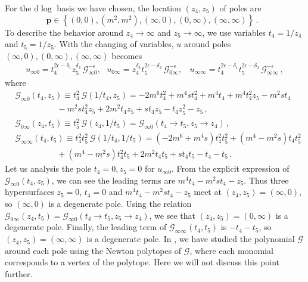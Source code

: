 \documentclass[a4paper,11pt]{article}
\newcommand{\nn}{\nonumber}
\newcommand{\nd}{\mathrm{d}}
\newcommand{\mG}{\mathcal{G}}
\newcommand{\ep}{\epsilon}
\newcommand{\bea}{\begin{eqnarray}}
\newcommand{\eea}{\end{eqnarray}}
\begin{document}
For the $\nd \log$ basis we have chosen, the location  $(z_4,z_5)$ of poles are 
\begin{equation}
    \bm{p} \in \left\{ (0,0), (m^2,m^2), (\infty,0), (0,\infty), (\infty,\infty) \right\} \, . ~~~\label{5.8}
\end{equation}
To describe the behavior around $z_4\to \infty$ and $z_5\to \infty$, we use variables $t_4=1/z_4$ and  $t_5=1/z_5$.
With the changing of variables, $u$ around poles $(\infty,0), (0,\infty), (\infty,\infty)$ becomes
\bea
u_{\infty 0}=t_4^{2\epsilon-\delta_1} z_5^{\delta_2} \, \mG_{\infty 0}^{-\epsilon},~~~
u_{0 \infty}= z_4^{\delta_2}t_5^{2\epsilon-\delta_2} \, \mG_{ 0\infty}^{-\epsilon},~~~~
u_{\infty \infty}=t_4^{2\epsilon-\delta_1} t_5^{2\ep-\delta_2} \, \mG_{\infty \infty}^{-\epsilon} \, ,  \eea
%
where 
%
\begin{align}
&\mG_{\infty 0}(t_4,z_5) \equiv t_4^2\  \mG\left(1/t_4,z_5\right)=-2 m^6 t_4^2 +m^4 s t_4^2+m^4 t_4 
+m^4 t_4^2 z_5-m^2 s t_4 \nn\\ 
& \quad \quad \quad \quad \quad  -m^2 s t_4^2 z_5+2 m^2 t_4 z_5+s t_4 z_5 -t_4 z_5^2-z_5 \,,\nn\\
& \mG_{0\infty }(z_4,t_5) \equiv t_5^2\  \mG\left(z_4,1/t_5\right) =\mG_{\infty 0}(t_4 \to t_5, z_5 \to z_4) \,,  \nn\\
&\mG_{\infty \infty }(t_4,t_5) \equiv t_4^2t_5^2\  \mG\left(1/t_4,1/t_5\right) = (-2 m^6 +m^4 s )t_4^2 t_5^2 
+(m^4 -m^2 s) t_4 t_5^2 \nn\\ 
& \quad \quad  \quad \quad \quad + (m^4 -m^2 s) t_4^2 t_5+2 m^2 t_4 t_5 
+s t_4 t_5-t_4-t_5 \,.
\label{eq:Ginf}
\end{align}
Let us analysis the pole $t_4=0,z_5=0$ for $u_{\infty 0}$. From the explicit expression of $\mG_{\infty 0}(t_4,z_5) $, we can see the leading terms are $m^4 t_4-m^2 s t_4-z_5$. Thus three hypersurfaces $z_5=0$, $t_4=0$ and $m^4 t_4-m^2 s t_4-z_5$ meet at $(z_4,z_5)=(\infty,0)$, so $(\infty,0)$ is a degenerate pole. Using the 
relation $\mG_{0\infty }(z_4,t_5)=\mG_{\infty 0}(t_4 \to t_5, z_5 \to z_4)$, we see that $(z_4,z_5)=(0,\infty)$ is a degenerate pole. Finally, the leading term  of  $\mG_{\infty \infty }(t_4,t_5) $ is $-t_4-t_5$,
so $(z_4,z_5)=(\infty,\infty)$ is a degenerate pole. 
 In \cite{Chen:2023kgw}, we have studied the polynomial $\mG$ around each pole using  the Newton polytopes of $\mG$,
 where each monomial corresponds to a vertex of the polytope. Here we will not discuss this point further.
 
\end{document}
